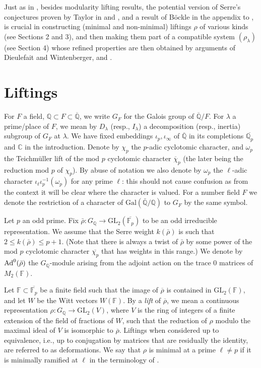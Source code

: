 \documentclass[12pt]{amsart}
\newcommand{\Q}{\mathbb{Q}}
\newcommand{\C}{\mathbb{C}}
\newcommand{\aQ}{\overline{\mathbb{Q}}}
\newcommand{\aFp}{\overline{\mathbb{F}_{p}}}
\newcommand{\aQp}{\overline{\mathbb{Q}_{p}}}
\newcommand{\rhobar}{\overline{\rho}}
\newcommand{\Ad}{{\rm Ad}}
\def\rhobar{ {\bar {\rho} } }
\def\rhob{ {\bar {\rho} } }
\newcommand{\Galois}{\mathrm{Gal}}
\newcommand{\Gal}{\Galois( \bar{ {\mathbb Q}}/{\mathbb Q})}
\newcommand{\F}{{\mathbb F}}
\begin{document}
Just as in \cite{KW}, besides modularity lifting results, the potential version of Serre's conjectures 
proven by Taylor in \cite{Tay1} and \cite{Tay2}, and a result of B\"ockle
in the appendix to \cite{[K03]}, is crucial in constructing (minimal and non-minimal) liftings 
$\rho$ of various kinds (see Sections 2 and 3), and then making them part of a compatible system 
$(\rho_\lambda)$ (see Section 4)  whose refined properties are then obtained by arguments 
of Dieulefait and Wintenberger,
\cite{D} and \cite{Wint}.


\section{Liftings}

For $F$ a field, $\Q \subset F \subset \aQ$,
we write $G_{F}$ for the Galois group of $\aQ / F$.
For $\lambda$ a prime/place of $F$,
we mean by $D_{\lambda}$ (resp., $I_{\lambda}$) a decomposition
(resp., inertia) subgroup of $G_F$ at  $\lambda$.
We have fixed embeddings $\iota_p, \iota_\infty$ of $\aQ$ in its completions $\aQp$ and $\C$ in the introduction.
Denote by $\chi_p$ the $p$-adic
cyclotomic character, and $\omega_p$ the Teichm\"uller lift of the mod $p$ cyclotomic character $\overline \chi_p$ 
(the later being the reduction mod $p$ of $\chi_p$). By abuse of notation we also denote by $\omega_p$ the $\ell$-adic character $\iota_\ell\iota_p^{-1}(\omega_p)$ for any prime $\ell$: this should not cause confusion as from the context it will be clear where the character is valued. For a number field $F$ we denote the restriction of a character of $\Gal$  to $G_F$ by the same symbol.

Let $p$ an odd prime.
Fix  $\rhob: G_{\Q}\rightarrow \mathrm{GL}_2 (\aFp )$
to be an odd irreducible representation.
We assume that the Serre
weight $k(\rhob)$ is such that $2 \leq k(\rhob) \leq p+1$. (Note that
there
is always
a twist of $\rhob$ by some power of the mod $p$ cyclotomic character
$\overline{\chi _p}$
that has weights in this range.) We denote by $\Ad^0(\rhobar)$ the $G_{\Q}$-module arising from the adjoint action on the trace 0 matrices of $M_2(\F)$.

Let $\F \subset \aFp$ be a finite field
such that the image of $\overline{\rho}$ is contained in
$\mathrm{GL}_2 (\F )$, and let $W$ be the Witt vectors $W(\F )$.
By a {\it lift} of $\overline{\rho}$, we mean a continuous representation
$\rho : G_{\Q}\rightarrow
\mathrm{GL}_2 ({V})$, where $ V$ is the ring of integers of a
finite
extension of the field of fractions of  $W$, such that
the reduction of $\rho$ modulo the maximal ideal of ${V}$ is
isomorphic to $\overline{\rho}$. Liftings when considered up to equivalence, i.e., up to conjugation by matrices that are residually the identity, are referred to as deformations.
We say that $\rho$ is minimal at a prime $\ell \neq p$ if it  is minimally
ramified at  $\ell$ in the terminology of \cite{[D97]}.
\end{document}
